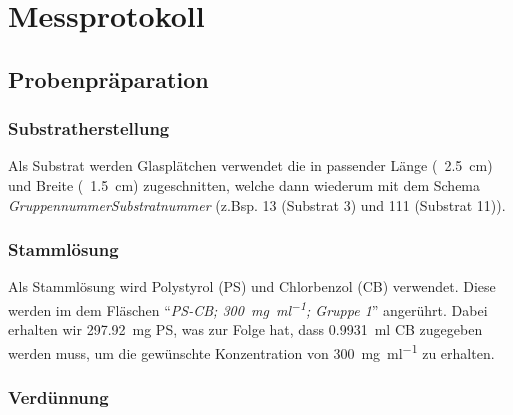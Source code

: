 
\def\skalierung{0.65}

\chapter{Messprotokoll}
\label{chap:protokoll}

\section{Probenpräparation}
\label{sec:prep}

\subsection{Substratherstellung}
\label{sub:substrat}
Als Substrat werden Glasplätchen verwendet die in passender Länge (~\SI{2,5}{\centi\metre}) und Breite (~\SI{1,5}{\centi\metre}) zugeschnitten, welche dann wiederum mit dem Schema \textit{GruppennummerSubstratnummer} (z.Bsp. 13 (Substrat 3) und 111 (Substrat 11)).

\subsection{Stammlösung}
\label{sub:stamm}
Als Stammlösung wird Polystyrol (PS) und Chlorbenzol (CB) verwendet. Diese werden im dem Fläschen \enquote{\textit{PS-CB; \SI{300}{\milli\gram\per\milli\litre}; Gruppe 1}} angerührt. Dabei erhalten wir \SI{297,92}{\milli\gram} PS, was zur Folge hat, dass \SI{0,9931}{\milli\litre} CB zugegeben werden muss, um die gewünschte Konzentration von \SI{300}{\milli\gram\per\milli\litre} zu erhalten.

\subsection{Verdünnung}
\label{sub:verduennung}

